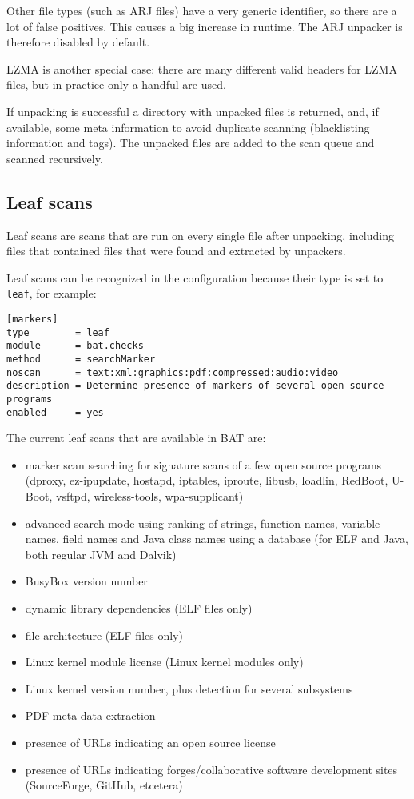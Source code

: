 \documentclass[10pt,a4paper]{article}
\begin{document}
Other file types (such as ARJ files) have a very generic identifier, so there
are a lot of false positives. This causes a big increase in runtime. The ARJ
unpacker is therefore disabled by default.

LZMA is another special case: there are many different valid headers for LZMA
files, but in practice only a handful are used.

If unpacking is successful a directory with unpacked files is returned, and, if
available, some meta information to avoid duplicate scanning (blacklisting
information and tags). The unpacked files are added to the scan queue and
scanned recursively.

\subsection{Leaf scans}

Leaf scans are scans that are run on every single file after unpacking,
including files that contained files that were found and extracted by unpackers.

Leaf scans can be recognized in the configuration because their type is set to
\texttt{leaf}, for example:

\begin{verbatim}
[markers]
type        = leaf
module      = bat.checks
method      = searchMarker
noscan      = text:xml:graphics:pdf:compressed:audio:video
description = Determine presence of markers of several open source programs
enabled     = yes
\end{verbatim}

The current leaf scans that are available in BAT are:

\begin{itemize}
\item marker scan searching for signature scans of a few open source programs
(dproxy, ez-ipupdate, hostapd, iptables, iproute, libusb, loadlin, RedBoot,
U-Boot, vsftpd, wireless-tools, wpa-supplicant)
\item advanced search mode using ranking of strings, function names, variable
names, field names and Java class names using a database (for ELF and Java,
both regular JVM and Dalvik)
\item BusyBox version number
\item dynamic library dependencies (ELF files only)
\item file architecture (ELF files only)
\item Linux kernel module license (Linux kernel modules only)
\item Linux kernel version number, plus detection for several subsystems
\item PDF meta data extraction
\item presence of URLs indicating an open source license
\item presence of URLs indicating forges/collaborative software development
sites (SourceForge, GitHub, etcetera)
\end{itemize}
\end{document}
